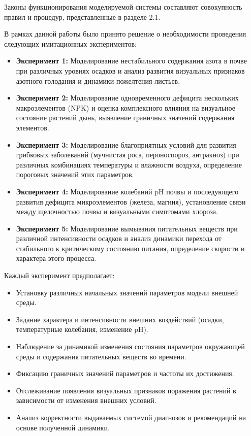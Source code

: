 Законы функционирования моделируемой системы составляют совокупность правил и процедур, представленные в разделе 2.1.

В рамках данной работы было принято решение о необходимости проведения следующих имитационных экспериментов:
\begin{itemize}
    \item \textbf{Эксперимент \num{1}:} Моделирование нестабильного содержания азота в почве при различных уровнях осадков и анализ развития визуальных признаков азотного голодания и динамики пожелтения листьев.
    \item \textbf{Эксперимент \num{2}:} Моделирование одновременного дефицита нескольких макроэлементов (NPK) и оценка комплексного влияния на визуальное состояние растений дынь, выявление граничных значений содержания элементов.
    \item \textbf{Эксперимент \num{3}:} Моделирование благоприятных условий для развития грибковых заболеваний (мучнистая роса, пероноспороз, антракноз) при различных комбинациях температуры и влажности воздуха, определение пороговых значений этих параметров.
    \item \textbf{Эксперимент \num{4}:} Моделирование колебаний pH почвы и последующего развития дефицита микроэлементов (железа, магния), установление связи между щелочностью почвы и визуальными симптомами хлороза.
    \item \textbf{Эксперимент \num{5}:} Моделирование вымывания питательных веществ при различной интенсивности осадков и анализ динамики перехода от стабильного к критическому состоянию питания, определение скорости и характера этого процесса.
\end{itemize}

Каждый эксперимент предполагает:
\begin{itemize}
    \item Установку различных начальных значений параметров модели внешней среды.
    \item Задание характера и интенсивности внешних воздействий (осадки, температурные колебания, изменение pH).
    \item Наблюдение за динамикой изменения состояния параметров окружающей среды и содержания питательных веществ во времени.
    \item Фиксацию граничных значений параметров и частоты их достижения.
    \item Отслеживание появления визуальных признаков поражения растений в зависимости от изменения внешних условий.
    \item Анализ корректности выдаваемых системой диагнозов и рекомендаций на основе полученной динамики.
\end{itemize}

